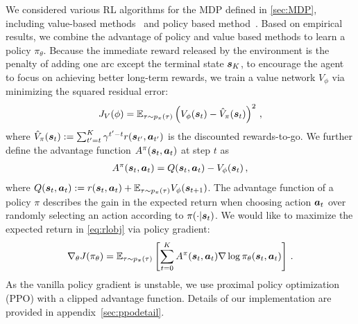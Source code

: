 \documentclass{article} %
\newcommand{\lei}[1]{{\color{red}{\bf\sf [Lei: #1]}}}
\begin{document}
We considered various RL algorithms for the MDP defined in \ref{sec:MDP}, including value-based methods~\citep{mnih2013playing, wang2015dueling} and policy based method~\citep{sutton2000policy,schulman2015trust,schulman2017proximal}. Based on empirical results, we combine the advantage of policy and value based methods to learn a policy $\pi_\theta$.
Because the immediate reward released by the environment is the penalty of adding one arc except the terminal state ${\boldsymbol s}_K$, to encourage the agent to focus on achieving better long-term rewards, we train a value network $V_{\phi}$ via
minimizing the squared residual error:
\begin{equation}
        J_{V}(\phi) = \mathbb{E}_{\tau\sim p_{\pi}(\tau)} \left( V_{\phi} ({\boldsymbol s}_t) - \hat{V}_{\pi}({\boldsymbol s}_t) \right)^2\,,
\end{equation}
where $\hat{V}_{\pi}({\boldsymbol s}_t):= \sum_{t'=t}^K \gamma^{t'-t} r({\boldsymbol s}_{t'}, {\boldsymbol a}_{t'})$ is the discounted rewards-to-go. 
We further define the advantage function $A^\pi({\boldsymbol s}_t, {\boldsymbol a}_t)$ at step $t$ 
as \begin{align}\label{eq:advantage_fun}
A^\pi({\boldsymbol s}_t, {\boldsymbol a}_t) = Q({\boldsymbol s}_t,{\boldsymbol a}_t) - V_\phi({\boldsymbol s}_t)\,,
\end{align}
where $Q({\boldsymbol s}_t,{\boldsymbol a}_t) := r({\boldsymbol s}_t, {\boldsymbol a}_t) + \mathbb{E}_{{\tau}\sim p_\pi(\tau)} V_\phi({\boldsymbol s}_{t+1})$. 
The advantage function of a policy $\pi$ describes the gain in the expected return when choosing action ${\boldsymbol a}_t$ over randomly selecting an action according to $\pi(\cdot|{\boldsymbol s}_t)$. We would like to maximize the expected return in \eqref{eq:rlobj} via policy gradient:
\begin{align}
{\nabla}_\theta J(\pi_\theta) = \mathbb{E}_{\tau\sim p_\pi(\tau)}\left[\sum_{t=0}^{K}A^\pi({\boldsymbol s}_t, {\boldsymbol a}_t)\nabla \log\pi_{\theta}({\boldsymbol s}_t,{\boldsymbol a}_t)\right] \,.
\end{align}
As the vanilla policy gradient is unstable, we use proximal policy optimization (PPO) with a clipped advantage function. Details of our implementation are provided in appendix~\ref{sec:ppodetail}.
%
\end{document}
